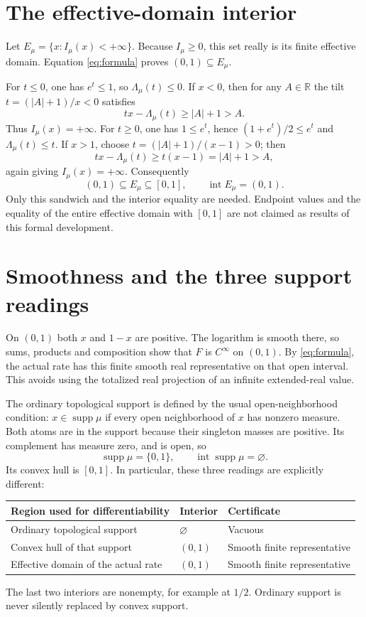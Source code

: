 \documentclass[11pt,a4paper]{article}
\newcommand{\R}{\mathbb R}
\newcommand{\supp}{\operatorname{supp}}
\newcommand{\intr}{\operatorname{int}}
\begin{document}
\section{The effective-domain interior}
Let $E_\mu=\{x:I_\mu(x)<+\infty\}$. Because $I_\mu\ge0$, this set really is its finite effective domain. Equation \eqref{eq:formula} proves $(0,1)\subseteq E_\mu$.

For $t\le0$, one has $e^t\le1$, so $\Lambda_\mu(t)\le0$. If $x<0$, then for any $A\in\R$ the tilt $t=(|A|+1)/x<0$ satisfies
\[
tx-\Lambda_\mu(t)\ge |A|+1>A.
\]
Thus $I_\mu(x)=+\infty$. For $t\ge0$, one has $1\le e^t$, hence $(1+e^t)/2\le e^t$ and $\Lambda_\mu(t)\le t$. If $x>1$, choose $t=(|A|+1)/(x-1)>0$; then
\[
tx-\Lambda_\mu(t)\ge t(x-1)=|A|+1>A,
\]
again giving $I_\mu(x)=+\infty$. Consequently
\[
(0,1)\subseteq E_\mu\subseteq[0,1],\qquad \intr E_\mu=(0,1).
\]
Only this sandwich and the interior equality are needed. Endpoint values and the equality of the entire effective domain with $[0,1]$ are not claimed as results of this formal development.

\section{Smoothness and the three support readings}
On $(0,1)$ both $x$ and $1-x$ are positive. The logarithm is smooth there, so sums, products and composition show that $F$ is $C^\infty$ on $(0,1)$. By \eqref{eq:formula}, the actual rate has this finite smooth real representative on that open interval. This avoids using the totalized real projection of an infinite extended-real value.

The ordinary topological support is defined by the usual open-neighborhood condition: $x\in\supp\mu$ if every open neighborhood of $x$ has nonzero measure. Both atoms are in the support because their singleton masses are positive. Its complement has measure zero, and is open, so
\[
\supp\mu=\{0,1\},\qquad \intr\supp\mu=\varnothing.
\]
Its convex hull is $[0,1]$. In particular, these three readings are explicitly different:
\begin{center}
\begin{tabular}{@{}lll@{}}
\toprule
Region used for differentiability & Interior & Certificate \\
\midrule
Ordinary topological support & $\varnothing$ & Vacuous \\
Convex hull of that support & $(0,1)$ & Smooth finite representative \\
Effective domain of the actual rate & $(0,1)$ & Smooth finite representative \\
\bottomrule
\end{tabular}
\end{center}
The last two interiors are nonempty, for example at $1/2$. Ordinary support is never silently replaced by convex support.
\end{document}
